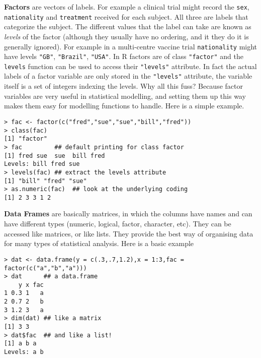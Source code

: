 \documentclass[10pt] {article}
\theoremstyle{definition}
\begin{document}
{\bf Factors} are vectors of labels. For example a clinical trial might record the {\tt sex}, {\tt nationality} and {\tt treatment} received for each subject. All three are labels that categorize the subject. The different values that the label can take are known as {\em levels} of the factor (although they usually have no ordering, and it they do it is generally ignored). For example in a multi-centre vaccine trial {\tt nationality} might have levels {\tt "GB"}, {\tt "Brazil"}, {\tt "USA"}. In R factors are of class \lstinline+"factor"+ and the {\tt levels} function can be used to access their \lstinline+"levels"+ attribute. In fact the actual labels of a factor variable are only stored in the \lstinline+"levels"+ attribute, the variable itself is a set of integers indexing the levels. Why all this fuss? Because factor variables are very useful in statistical modelling, and setting them up this way makes them easy for modelling functions to handle. Here is a simple example. 
\begin{lstlisting}
> fac <- factor(c("fred","sue","sue","bill","fred"))
> class(fac)
[1] "factor"
> fac         ## default printing for class factor 
[1] fred sue  sue  bill fred
Levels: bill fred sue
> levels(fac) ## extract the levels attribute
[1] "bill" "fred" "sue" 
> as.numeric(fac)  ## look at the underlying coding
[1] 2 3 3 1 2
\end{lstlisting}

{\bf Data Frames} are basically matrices, in which the columns have names and can have different types (numeric, logical, factor, character, etc). They can be accessed like matrices, or like lists. They provide the best way of organising data for many types of statistical analysis. Here is a basic example 
\begin{lstlisting}
> dat <- data.frame(y = c(.3,.7,1.2),x = 1:3,fac = factor(c("a","b","a")))
> dat      ## a data.frame
    y x fac
1 0.3 1   a
2 0.7 2   b
3 1.2 3   a
> dim(dat) ## like a matrix
[1] 3 3
> dat$fac  ## and like a list!
[1] a b a
Levels: a b
\end{lstlisting}
\end{document}
